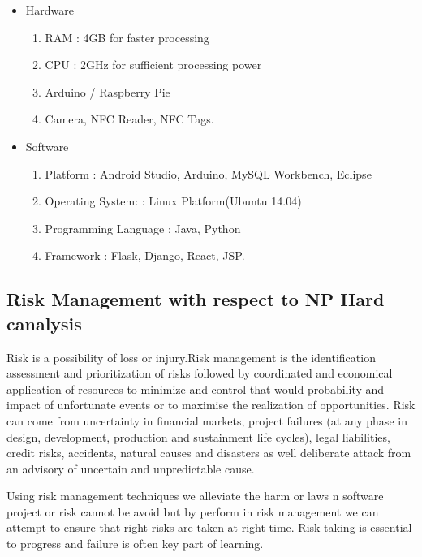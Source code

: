 \documentclass[10pt,a4paper]
{article}
\numberwithin{table}{section}
\begin{document}
{{\begin{normalsize}
\begin{itemize}
\item Hardware
\begin{enumerate}
\item RAM : 4GB for faster processing 
\item CPU : 2GHz for sufficient processing power
\item Arduino / Raspberry Pie
\item  Camera, NFC Reader, NFC Tags.
\end{enumerate}
\end{itemize}

\begin{itemize}
\item Software
\begin{enumerate}
\item Platform : Android Studio, Arduino, MySQL Workbench, Eclipse
\item Operating System:  : Linux Platform(Ubuntu 14.04)
\item Programming Language : Java, Python
\item Framework : Flask, Django, React, JSP.


\end{enumerate}
\end{itemize}

\subsection{Risk Management with respect to NP Hard canalysis}
\hspace*{0.3cm}Risk is a possibility of loss or injury.Risk management is the identification assessment and prioritization of risks followed by coordinated and economical application of resources to minimize and control that would probability and impact of unfortunate events or to maximise the realization of opportunities.
Risk can come from uncertainty in financial markets, project failures (at any phase in design, development, production and sustainment life cycles), legal liabilities, credit risks, accidents, natural causes and disasters as well deliberate attack from an advisory of uncertain and unpredictable cause.

Using risk management techniques we alleviate the harm or laws n software project or risk cannot be avoid but by perform in risk management we can attempt to ensure that right risks are taken at right time.
Risk taking is essential to progress and failure is often key part of learning.


\end{normalsize}}}
\end{document}
